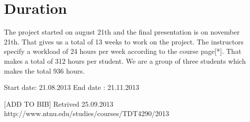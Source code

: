 \section{Duration}
The project started on august 21th and the final presentation is on november 21th. That gives us a total of 13 weeks to work on the project. The instructors specify a workload of 24 hours per week according to the course page[*]. That makes a total of 312 hours per student. We are a group of three students which makes the total 936 hours.

Start date: 21.08.2013
End date : 21.11.2013

[ADD TO BIB] Retrived 25.09.2013 http://www.ntnu.edu/studies/courses/TDT4290/2013
